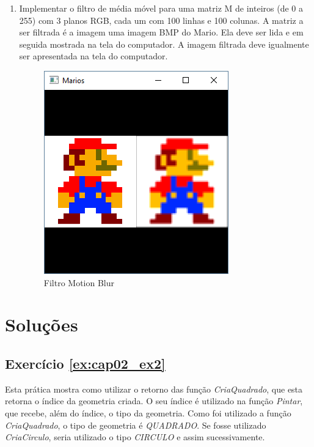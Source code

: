 \begin{enumerate}
  \item
Implementar o filtro de média móvel para uma matriz M de inteiros (de 0 a 255) com 3 planos RGB, cada um com 100 linhas e 100 colunas.
A matriz a ser filtrada é a imagem uma imagem BMP do Mario. Ela deve ser lida e em seguida mostrada na tela do computador. A imagem filtrada deve igualmente ser apresentada na tela do computador.
  \label{ex:cap02_ex27}

  \begin{figure}[H]
    \centerline{\includegraphics[width=.5\textwidth]{img/cap2_ex27.png}}
    \caption{Filtro Motion Blur}
    \label{fig:cap02_ex27}
  \end{figure}
\end{enumerate}

\section*{Soluções}

\subsection*{Exercício \ref{ex:cap02_ex2}}
Esta prática mostra como utilizar o retorno das função \emph{CriaQuadrado}, que esta retorna o índice da geometria criada. O seu índice é utilizado na função \emph{Pintar}, que recebe, além do índice, o tipo da geometria. Como foi utilizado a função \emph{CriaQuadrado}, o tipo de geometria é \emph{QUADRADO}. Se fosse utilizado \emph{CriaCirculo}, seria utilizado o tipo \emph{CIRCULO} e assim sucessivamente.


